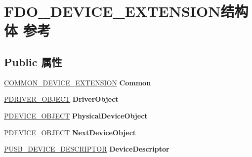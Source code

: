 \hypertarget{struct_f_d_o___d_e_v_i_c_e___e_x_t_e_n_s_i_o_n}{}\section{F\+D\+O\+\_\+\+D\+E\+V\+I\+C\+E\+\_\+\+E\+X\+T\+E\+N\+S\+I\+O\+N结构体 参考}
\label{struct_f_d_o___d_e_v_i_c_e___e_x_t_e_n_s_i_o_n}
\subsection*{Public 属性}
\begin{DoxyCompactItemize}
\item 
\mbox{\label{struct_f_d_o___d_e_v_i_c_e___e_x_t_e_n_s_i_o_n_ab0d2c7f3afc3f94bd5ba33aff4412ea0}} 
\hyperlink{struct_c_o_m_m_o_n___d_e_v_i_c_e___e_x_t_e_n_s_i_o_n}{C\+O\+M\+M\+O\+N\+\_\+\+D\+E\+V\+I\+C\+E\+\_\+\+E\+X\+T\+E\+N\+S\+I\+ON} {\bfseries Common}
\item 
\mbox{\label{struct_f_d_o___d_e_v_i_c_e___e_x_t_e_n_s_i_o_n_a3c47b74bf5c9635c567418920a95513f}} 
\hyperlink{struct___d_r_i_v_e_r___o_b_j_e_c_t}{P\+D\+R\+I\+V\+E\+R\+\_\+\+O\+B\+J\+E\+CT} {\bfseries Driver\+Object}
\item 
\mbox{\label{struct_f_d_o___d_e_v_i_c_e___e_x_t_e_n_s_i_o_n_ab88eb59880040268ea93bb38455a6916}} 
\hyperlink{struct___d_e_v_i_c_e___o_b_j_e_c_t}{P\+D\+E\+V\+I\+C\+E\+\_\+\+O\+B\+J\+E\+CT} {\bfseries Physical\+Device\+Object}
\item 
\mbox{\label{struct_f_d_o___d_e_v_i_c_e___e_x_t_e_n_s_i_o_n_abedc9507780669bcfc7738da93dc0a76}} 
\hyperlink{struct___d_e_v_i_c_e___o_b_j_e_c_t}{P\+D\+E\+V\+I\+C\+E\+\_\+\+O\+B\+J\+E\+CT} {\bfseries Next\+Device\+Object}
\item 
\mbox{\label{struct_f_d_o___d_e_v_i_c_e___e_x_t_e_n_s_i_o_n_a5f4c356b86d80c01098aac4589e84eb3}} 
\hyperlink{struct___u_s_b___d_e_v_i_c_e___d_e_s_c_r_i_p_t_o_r}{P\+U\+S\+B\+\_\+\+D\+E\+V\+I\+C\+E\+\_\+\+D\+E\+S\+C\+R\+I\+P\+T\+OR} {\bfseries Device\+Descriptor}

\end{DoxyCompactItemize}
